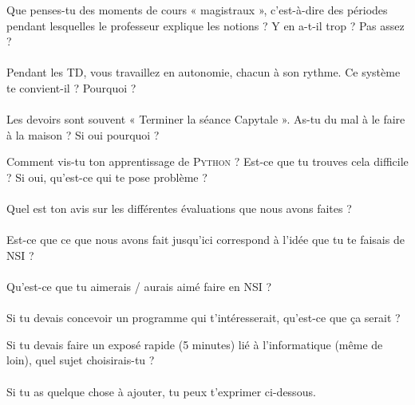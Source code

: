 \documentclass[a4paper,12pt,french]{article}
\begin{document}

Que penses-tu des moments de cours « magistraux », c'est-à-dire des périodes pendant lesquelles le professeur explique les notions ? Y en a-t-il trop ? Pas assez ?\\

\\

Pendant les TD, vous travaillez en autonomie, chacun à son rythme. Ce système te convient-il ? Pourquoi ?\\

\\

Les devoirs sont souvent « Terminer la séance Capytale ». As-tu du mal à le faire à la maison ? Si oui pourquoi ?\\




Comment vis-tu ton apprentissage de \textsc{Python} ? Est-ce que tu trouves cela difficile ? Si oui, qu'est-ce qui te pose problème ?\\

\\

Quel est ton avis sur les différentes évaluations que nous avons faites ? \\

\\

Est-ce que ce que nous avons fait jusqu'ici correspond à l'idée que tu te faisais de NSI ?\\

\\

Qu'est-ce que tu aimerais / aurais aimé faire en NSI ?\\

\\

Si tu devais concevoir un programme qui t'intéresserait, qu'est-ce que ça serait ?\\



Si tu devais faire un exposé rapide (5 minutes) lié à l'informatique (même de loin), quel sujet choisirais-tu ?\\

\\

Si tu as quelque chose à ajouter, tu peux t'exprimer ci-dessous.\\

\\
\end{document}
